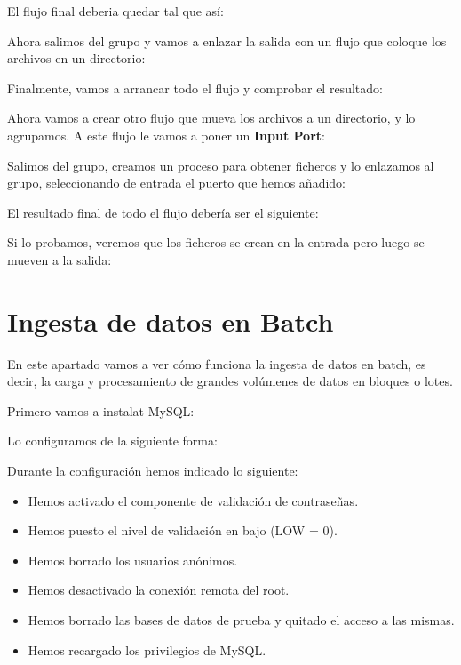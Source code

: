 \documentclass{../../miPlantilla}
\begin{document}
El flujo final deberia quedar tal que así:


Ahora salimos del grupo y vamos a enlazar la salida con un flujo que coloque los archivos en un directorio:


Finalmente, vamos a arrancar todo el flujo y comprobar el resultado:


\newpage

Ahora vamos a crear otro flujo que mueva los archivos a un directorio, y lo agrupamos. A este flujo le vamos a poner un
\textbf{Input Port}:


Salimos del grupo, creamos un proceso para obtener ficheros y lo enlazamos al grupo, seleccionando de entrada el puerto que hemos
añadido:


El resultado final de todo el flujo debería ser el siguiente:


\newpage

Si lo probamos, veremos que los ficheros se crean en la entrada pero luego se mueven a la salida:


\section{Ingesta de datos en Batch}
En este apartado vamos a ver cómo funciona la ingesta de datos en batch, es decir, la carga y procesamiento de grandes volúmenes
de datos en bloques o lotes.

Primero vamos a instalat MySQL:


\newpage

Lo configuramos de la siguiente forma:


Durante la configuración hemos indicado lo siguiente:
\begin{itemize}
    \item Hemos activado el componente de validación de contraseñas.
    \item Hemos puesto el nivel de validación en bajo (LOW = 0).
    \item Hemos borrado los usuarios anónimos.
    \item Hemos desactivado la conexión remota del root.
    \item Hemos borrado las bases de datos de prueba y quitado el acceso a las mismas.
    \item Hemos recargado los privilegios de MySQL.
\end{itemize}
\end{document}
